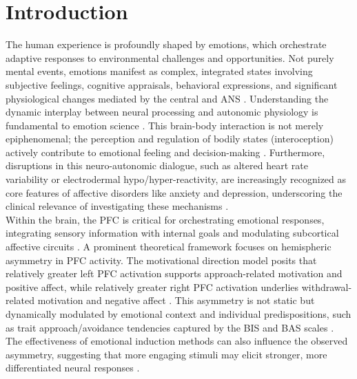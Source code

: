 \documentclass[12pt]{article} %
\begin{document}
\newpage


\section{Introduction}

The human experience is profoundly shaped by emotions, which orchestrate adaptive responses to environmental challenges and opportunities. Not purely mental events, emotions manifest as complex, integrated states involving subjective feelings, cognitive appraisals, behavioral expressions, and significant physiological changes mediated by the central and \gls{ANS} \parencite{barrettHandbookEmotions2016, kreibigAutonomicNervousSystem2010}. Understanding the dynamic interplay between neural processing and autonomic physiology is fundamental to emotion science \parencite{critchleyNeuralMechanismsAutonomic2005}. This brain-body interaction is not merely epiphenomenal; the perception and regulation of bodily states (interoception) actively contribute to emotional feeling and decision-making \parencite{antoniodamasioDescartesErrorEmotion2005}. Furthermore, disruptions in this neuro-autonomic dialogue, such as altered heart rate variability or electrodermal hypo/hyper-reactivity, are increasingly recognized as core features of affective disorders like anxiety and depression, underscoring the clinical relevance of investigating these mechanisms \parencite{thayerHeartRateVariability2009, beauchaineVagalToneDevelopment2001}.\\

Within the brain, the \gls{PFC} is critical for orchestrating emotional responses, integrating sensory information with internal goals and modulating subcortical affective circuits \parencite{fusterPrefrontalCortex2008}. A prominent theoretical framework focuses on hemispheric asymmetry in \gls{PFC} activity. The motivational direction model posits that relatively greater left \gls{PFC} activation supports approach-related motivation and positive affect, while relatively greater right \gls{PFC} activation underlies withdrawal-related motivation and negative affect \parencite{davidsonWhatDoesPrefrontal2004, harmon-jonesAngerFrontalBrain1996}. This asymmetry is not static but dynamically modulated by emotional context and individual predispositions, such as trait approach/avoidance tendencies captured by the \gls{BIS} and \gls{BAS} scales \parencite{carverBehavioralInhibitionBehavioral1994, suttonPrefrontalBrainAsymmetry1997, rodriguesMindMovementFrontal2018}. The effectiveness of emotional induction methods can also influence the observed asymmetry, suggesting that more engaging stimuli may elicit stronger, more differentiated neural responses \parencite{rodriguesMethodsMatterExamination2021}.\\
\end{document}
